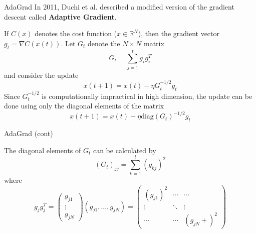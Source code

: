 \documentclass{beamer}
\begin{document}
\begin{frame}{AdaGrad}
	In 2011, Duchi et al. described a modified version of the gradient descent called \textbf{Adaptive Gradient}. 
	
	If $C(x)$ denotes the cost function ($x\in \mathbb{R}^N$), then the gradient vector $g_t= \nabla C(x(t))$.  Let $G_t$ denote the $N \times N$ matrix
	\begin{equation*}
		G_t = \sum_{j=1}^{t} g_i g_i^T
	\end{equation*}
	and consider the update
	\begin{equation*}
		x(t+1)=x(t)- \eta G_t^{-1/2} g_t
	\end{equation*}
Since $G_t^{-1/2}$ is computationally impractical in high dimension, the update can be done using only the diagonal elements of the matrix
	\begin{equation*}
	x(t+1)=x(t)- \eta \text{diag}(G_t)^{-1/2} g_t
\end{equation*}


\end{frame}

\begin{frame}{AdaGrad (cont)}
	
	
	The diagonal elements of $G_t$ can be calculated by
	\begin{equation*}
		(G_t)_{jj}= \sum_{k=1}^t (g_{kj})^2
	\end{equation*}
where 
\begin{equation*}
	g_jg_j^T= \begin{pmatrix}
		g_{j1} \\
	\vdots\\
g_{jN}
\end{pmatrix}
(g_{j1},\ldots, g_{jN}) =
\begin{pmatrix}
	(g_{j1})^2 & \cdots & \cdots \\
	\vdots & \ddots & \vdots \\
	\cdots & \cdots & (g_{jN}+)^2
\end{pmatrix}
\end{equation*}
\end{frame}
\end{document}
